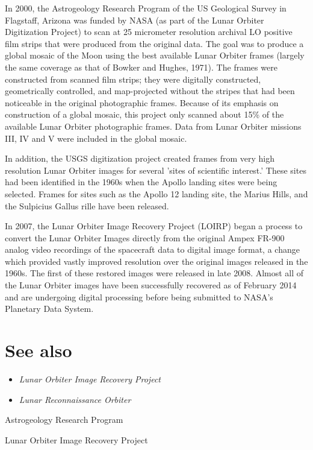 In 2000, the Astrogeology Research Program of the US Geological Survey
in Flagstaff, Arizona was funded by NASA (as part of the Lunar Orbiter
Digitization Project) to scan at 25 micrometer resolution archival LO
positive film strips that were produced from the original data. The goal
was to produce a global mosaic of the Moon using the best available
Lunar Orbiter frames (largely the same coverage as that of Bowker and
Hughes, 1971). The frames were constructed from scanned film strips;
they were digitally constructed, geometrically controlled, and
map-projected without the stripes that had been noticeable in the
original photographic frames. Because of its emphasis on construction of
a global mosaic, this project only scanned about 15\% of the available
Lunar Orbiter photographic frames. Data from Lunar Orbiter missions III,
IV and V were included in the global mosaic.

In addition, the USGS digitization project created frames from very high
resolution Lunar Orbiter images for several 'sites of scientific
interest.' These sites had been identified in the 1960s when the Apollo
landing sites were being selected. Frames for sites such as the Apollo
12 landing site, the Marius Hills, and the Sulpicius Gallus rille have
been released.

In 2007, the Lunar Orbiter Image Recovery Project (LOIRP) began a
process to convert the Lunar Orbiter Images directly from the original
Ampex FR-900 analog video recordings of the spacecraft data to digital
image format, a change which provided vastly improved resolution over
the original images released in the 1960s. The first of these restored
images were released in late 2008. Almost all of the Lunar Orbiter
images have been successfully recovered as of February 2014 and are
undergoing digital processing before being submitted to NASA's Planetary
Data System.

\section{See also}\label{see-also}

\begin{itemize}
\item
  \emph{Lunar Orbiter Image Recovery Project}
\item
  \emph{Lunar Reconnaissance Orbiter}
\end{itemize}

Astrogeology Research Program

Lunar Orbiter Image Recovery Project


